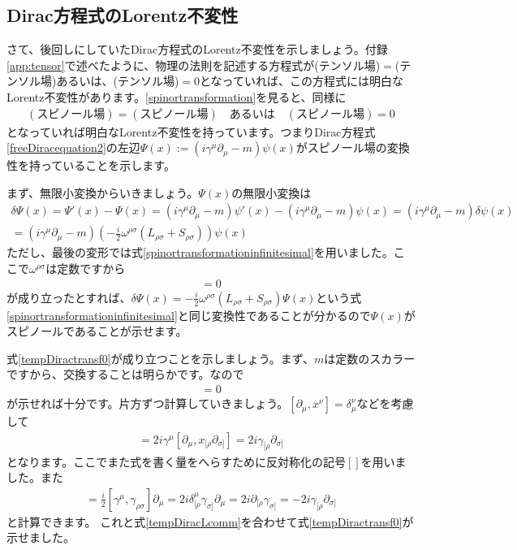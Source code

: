 \documentclass[report,paper=a4, fontsize=12pt, line_length=16cm, number_of_lines=33,dvipdfmx]{jlreq}
\numberwithin{equation}{chapter}
\newcommand{\del}{\partial}
\begin{document}
\subsection{Dirac方程式のLorentz不変性}
さて、後回しにしていたDirac方程式のLorentz不変性を示しましょう。付録\ref{app:tensor}で述べたように、物理の法則を記述する方程式が(テンソル場)$=$(テンソル場)あるいは、(テンソル場)$=0$となっていれば、この方程式には明白なLorentz不変性があります。\eqref{spinortransformation}を見ると、同様に
\begin{align}
  (\text{スピノール場})=(\text{スピノール場})\text{　あるいは　}(\text{スピノール場})=0
\end{align}
となっていれば明白なLorentz不変性を持っています。つまりDirac方程式\eqref{freeDiracequation2}の左辺$\Psi(x):=(i\gamma^{\mu}\del_{\mu}-m)\psi(x)$がスピノール場の変換性を持っていることを示します。

まず、無限小変換からいきましょう。$\Psi(x)$の無限小変換は
\begin{align}
  \delta \Psi(x)=
  \Psi'(x)-\Psi(x)=
  (i\gamma^{\mu}\del_{\mu}-m)\psi'(x)-
  (i\gamma^{\mu}\del_{\mu}-m)\psi(x)
  = (i\gamma^{\mu}\del_{\mu}-m)\delta \psi(x)\nonumber\\
  =(i\gamma^{\mu}\del_{\mu}-m)(-\frac{i}{2}\omega^{\rho\sigma}(L_{\rho\sigma}+S_{\rho\sigma}))\psi(x)
\end{align}
ただし、最後の変形では式\eqref{spinortransformationinfinitesimal}を用いました。ここで$\omega^{\rho\sigma}$は定数ですから
\begin{align}
  [(\gamma^{\mu}\del_{\mu}-m), L_{\rho\sigma}+S_{\rho\sigma})]=0\label{tempDiractransf0}
\end{align}
が成り立ったとすれば、$\delta \Psi(x)=-\frac{i}{2}\omega^{\rho\sigma}(L_{\rho\sigma}+S_{\rho\sigma})\Psi(x)$という式\eqref{spinortransformationinfinitesimal}と同じ変換性であることが分かるので$\Psi(x)$がスピノールであることが示せます。

式\eqref{tempDiractransf0}が成り立つことを示しましょう。まず、$m$は定数のスカラーですから、交換することは明らかです。なので
\begin{align}
  [\gamma^{\mu}\del_{\mu},L_{\rho\sigma}+S_{\rho\sigma}]=0
\end{align}
が示せれば十分です。片方ずつ計算していきましょう。$[\del_{\mu},x^{\nu}]=\delta_{\mu}^{\nu}$などを考慮して
\begin{align}
  [\gamma^{\mu}\del_{\mu},L_{\mu\nu}]
  =2i\gamma^{\mu}[\del_{\mu},x_{[\rho}\del_{\sigma]}]
  =2i\gamma_{[\rho}\del_{\sigma]}\label{tempDiracLcomm}
\end{align}
となります。ここでまた式を書く量をへらすために反対称化の記号$[]$を用いました。また
\begin{align}
  [\gamma^{\mu}\del_{\mu},S_{\rho\sigma}]=\frac{i}{2}[\gamma^{\mu},\gamma_{\rho\sigma}]\del_{\mu}
  =2i\delta^{\mu}_{[\rho}\gamma_{\sigma]}\del_{\mu}
  =2i\del_{[\rho}\gamma_{\sigma]} 
  =-2i\gamma_{[\rho}\del_{\sigma]} 
\end{align}
と計算できます。
これと式\eqref{tempDiracLcomm}を合わせて式\eqref{tempDiractransf0}が示せました。
\end{document}

